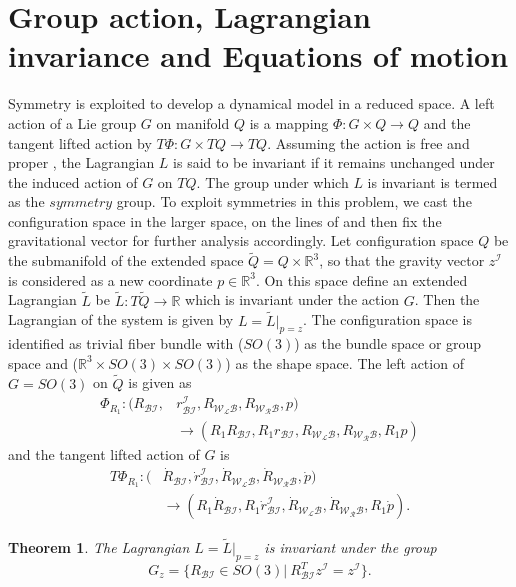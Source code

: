 \documentclass[letterpaper, 10 pt, conference]{ieeeconf}  \newcommand{\RN}[1]{\textup{\uppercase\expandafter{\romannumeral#1}}}
\newtheorem{theorem}{Theorem}
\begin{document}
\section{Group action, Lagrangian invariance and Equations of motion}
Symmetry is exploited to develop a dynamical model in a reduced space. A left action of a Lie group $G$ on manifold $Q$ is a mapping $\Phi : G \times Q \longrightarrow Q$ and the tangent lifted action by $T\Phi: G \times TQ \longrightarrow TQ $. Assuming the action is free and proper \cite{Marsden Ratiu intro to}, the Lagrangian $L$ is said to be invariant if it remains unchanged under the induced action of $G$ on $TQ$. The group under which $L$ is invariant is termed as the $symmetry$ group. To exploit symmetries in this problem, we cast the configuration space in the larger space, on the lines of \cite{holm} and then fix the gravitational vector for further analysis accordingly. Let configuration space $Q$ be the submanifold of the extended space $\tilde{Q} = Q \times \mathbb{R}^{3}$, so that the gravity vector $z^{\mathcal{I}}$ is considered as a new coordinate $p \in \mathbb{R}^{3}$. On this space define an extended Lagrangian $\tilde{L}$ be $\tilde{L}: T\tilde{Q} \longrightarrow \mathbb{R}$ which is invariant under the action $G$. Then the Lagrangian of the system is given by $L = \tilde{L}|_{p=z}$. The configuration space is identified as trivial fiber bundle with ($SO(3)$) as the bundle space or group space and ($ \mathbb{R}^{3} \times SO(3) \times SO(3)$) as the shape space. The left action of $G= SO(3)$ on $\tilde{Q}$ is given as
\begin{align*}
\Phi_{R_{1}}: (R_{\mathcal{BI}}, & r_{\mathcal{BI}}^\mathcal{I}, R_\mathcal{W_LB},R_\mathcal{W_RB},p) \\
& \longrightarrow (R_{1}R_{\mathcal{BI}}, R_{1}r_{\mathcal{BI}}, R_\mathcal{W_LB},R_\mathcal{W_RB},R_{1}p)
\end{align*}
and the tangent lifted action of $G$ is
\begin{align*}
T\Phi_{R_{1}}:  ( & \dot{R}_{\mathcal{BI}}, \dot{r}_{\mathcal{BI}}^\mathcal{I}, \dot{R}_\mathcal{W_LB},\dot{R}_\mathcal{W_RB},\dot{p}) \\
& \longrightarrow (R_{1}\dot{R}_{\mathcal{BI}}, R_{1}\dot{r}_{\mathcal{BI}}^\mathcal{I}, \dot{R}_\mathcal{W_LB},\dot{R}_\mathcal{W_RB},R_{1}\dot{p}).
\end{align*}
\begin{theorem}
The Lagrangian $L = \tilde{L}|_{p=z}$ is invariant under the group 
$$G_{z} = \{ R_{\mathcal{BI}} \in SO(3) | ~ R_{\mathcal{BI}}^{T}z^\mathcal{I} = z^\mathcal{I} \}.$$
\end{theorem}
\end{document}
